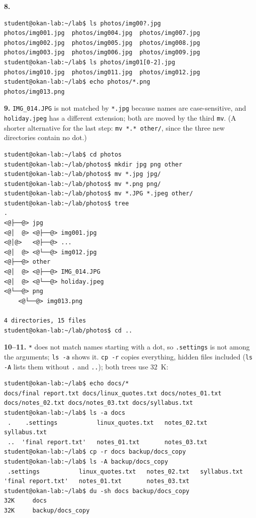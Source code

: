 \documentclass[11pt,a4paper]{article}
\newcommand{\cmd}[1]{\texttt{#1}}
\begin{document}
\textbf{8.}
\begin{lstlisting}[style=term,basicstyle=\ttfamily\scriptsize\color{light}]
student@okan-lab:~/lab$ ls photos/img00?.jpg
photos/img001.jpg  photos/img004.jpg  photos/img007.jpg
photos/img002.jpg  photos/img005.jpg  photos/img008.jpg
photos/img003.jpg  photos/img006.jpg  photos/img009.jpg
student@okan-lab:~/lab$ ls photos/img01[0-2].jpg
photos/img010.jpg  photos/img011.jpg  photos/img012.jpg
student@okan-lab:~/lab$ echo photos/*.png
photos/img013.png
\end{lstlisting}

\textbf{9.} \texttt{IMG\_014.JPG} is not matched by \texttt{*.jpg} because names are case-sensitive, and \texttt{holiday.jpeg} has a different extension; both are moved by the third \cmd{mv}. (A shorter alternative for the last step: \cmd{mv *.* other/}, since the three new directories contain no dot.)
\begin{lstlisting}[style=term,basicstyle=\ttfamily\scriptsize\color{light}]
student@okan-lab:~/lab$ cd photos
student@okan-lab:~/lab/photos$ mkdir jpg png other
student@okan-lab:~/lab/photos$ mv *.jpg jpg/
student@okan-lab:~/lab/photos$ mv *.png png/
student@okan-lab:~/lab/photos$ mv *.JPG *.jpeg other/
student@okan-lab:~/lab/photos$ tree
.
<@├──@> jpg
<@│  @> <@├──@> img001.jpg
<@│@>   <@├──@> ...
<@│  @> <@└──@> img012.jpg
<@├──@> other
<@│  @> <@├──@> IMG_014.JPG
<@│  @> <@└──@> holiday.jpeg
<@└──@> png
    <@└──@> img013.png

4 directories, 15 files
student@okan-lab:~/lab/photos$ cd ..
\end{lstlisting}

\textbf{10--11.} \texttt{*} does not match names starting with a dot, so \texttt{.settings} is not among the arguments; \cmd{ls -a} shows it. \cmd{cp -r} copies everything, hidden files included (\cmd{ls -A} lists them without \texttt{.} and \texttt{..}); both trees use $32$~K:
\begin{lstlisting}[style=term,basicstyle=\ttfamily\scriptsize\color{light}]
student@okan-lab:~/lab$ echo docs/*
docs/final report.txt docs/linux_quotes.txt docs/notes_01.txt docs/notes_02.txt docs/notes_03.txt docs/syllabus.txt
student@okan-lab:~/lab$ ls -a docs
 .    .settings           linux_quotes.txt   notes_02.txt   syllabus.txt
 ..  'final report.txt'   notes_01.txt       notes_03.txt
student@okan-lab:~/lab$ cp -r docs backup/docs_copy
student@okan-lab:~/lab$ ls -A backup/docs_copy
 .settings           linux_quotes.txt   notes_02.txt   syllabus.txt
'final report.txt'   notes_01.txt       notes_03.txt
student@okan-lab:~/lab$ du -sh docs backup/docs_copy
32K     docs
32K     backup/docs_copy
\end{lstlisting}
\end{document}
